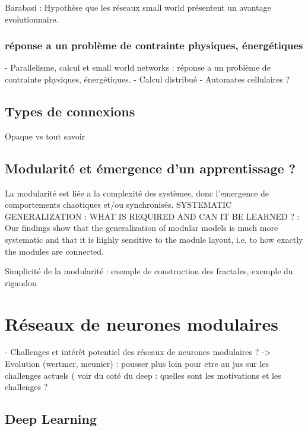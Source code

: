 Barabasi : Hypothèse que les réseaux small world présentent un avantage evolutionnaire.

\subsubsection{réponse a un problème de contrainte physiques, énergétiques}

- Parallelisme, calcul et small world networks : réponse a un problème de contrainte physiques, énergétiques. 
- Calcul distribué 
- Automates cellulaires  ?


\subsection{Types de connexions}

Opaque vs tout savoir

\subsection{Modularité et émergence d'un apprentissage ? }

La modularité est liée a la complexité des systèmes, donc l'emergence de comportements chaotiques et/ou synchronisés. 
SYSTEMATIC GENERALIZATION : WHAT IS REQUIRED
AND CAN IT BE LEARNED ? : 
Our findings show that the generalization of modular models is much more systematic and that it is highly sensitive to the module layout, i.e. to how exactly the modules are connected.

Simplicité de la modularité : exemple de construction des fractales, exemple du rigaudon


\section{Réseaux de neurones modulaires}

- Challenges et intérêt potentiel des réseaux de neurones modulaires ? -> Evolution (wertmer, meunier) : pousser plus loin pour etre au jus sur les challenges actuels ( voir du coté du deep : quelles sont les motivations et les challenges ? 



\subsection{Deep Learning}

